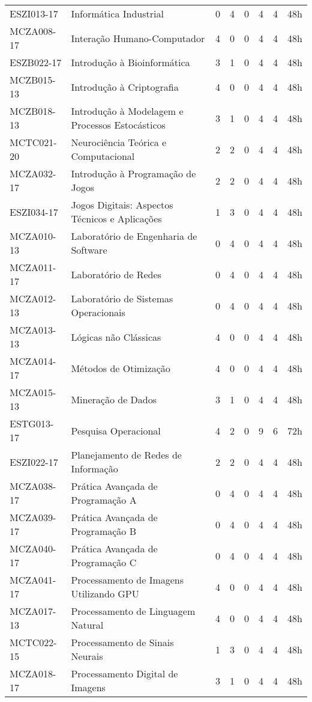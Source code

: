 \documentclass[a4paper]{article}
\begin{document}
\begin{longtable}{|l|l|llll|l|l|}
ESZI013-17 & Informática Industrial & 0 & 4 & 0 & 4 & 4 & 48h \\
MCZA008-17 & Interação Humano-Computador & 4 & 0 & 0 & 4 & 4 & 48h \\
ESZB022-17 & Introdução à Bioinformática & 3 & 1 & 0 & 4 & 4 & 48h \\
MCZB015-13 & Introdução à Criptografia & 4 & 0 & 0 & 4 & 4 & 48h \\
MCZB018-13 & Introdução à Modelagem e Processos Estocásticos & 3 & 1 & 0 & 4 & 4 & 48h \\
MCTC021-20 & Neurociência Teórica e Computacional & 2 & 2 & 0 & 4 & 4 & 48h \\
MCZA032-17 & Introdução à Programação de Jogos & 2 & 2 & 0 & 4 & 4 & 48h \\
ESZI034-17 & Jogos Digitais: Aspectos Técnicos e Aplicações & 1 & 3 & 0 & 4 & 4 & 48h \\
MCZA010-13 & Laboratório de Engenharia de Software & 0 & 4 & 0 & 4 & 4 & 48h \\
MCZA011-17 & Laboratório de Redes & 0 & 4 & 0 & 4 & 4 & 48h \\
MCZA012-13 & Laboratório de Sistemas Operacionais & 0 & 4 & 0 & 4 & 4 & 48h \\
MCZA013-13 & Lógicas não Clássicas & 4 & 0 & 0 & 4 & 4 & 48h \\
MCZA014-17 & Métodos de Otimização & 4 & 0 & 0 & 4 & 4 & 48h \\
MCZA015-13 & Mineração de Dados & 3 & 1 & 0 & 4 & 4 & 48h \\
ESTG013-17 & Pesquisa Operacional & 4 & 2 & 0 & 9 & 6 & 72h \\
ESZI022-17 & Planejamento de Redes de Informação & 2 & 2 & 0 & 4 & 4 & 48h \\
MCZA038-17 & Prática Avançada de Programação A & 0 & 4 & 0 & 4 & 4 & 48h \\
MCZA039-17 & Prática Avançada de Programação B & 0 & 4 & 0 & 4 & 4 & 48h \\
MCZA040-17 & Prática Avançada de Programação C & 0 & 4 & 0 & 4 & 4 & 48h \\
MCZA041-17 & Processamento de Imagens Utilizando GPU & 4 & 0 & 0 & 4 & 4 & 48h \\
MCZA017-13 & Processamento de Linguagem Natural & 4 & 0 & 0 & 4 & 4 & 48h \\
MCTC022-15 & Processamento de Sinais Neurais & 1 & 3 & 0 & 4 & 4 & 48h \\
MCZA018-17 & Processamento Digital de Imagens & 3 & 1 & 0 & 4 & 4 & 48h \\

\end{longtable}
\end{document}
